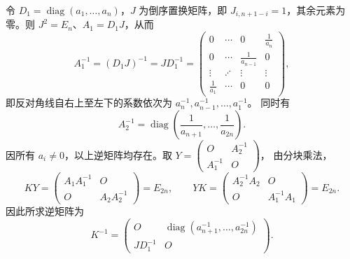 \documentclass[11pt,a4paper,fontset=fandol]{ctexart}
\newcommand{\ans}[1]{\boxed{#1}}
\newcommand{\diag}{\operatorname{diag}}
\begin{document}
令 $D_1=\diag(a_1,\ldots,a_n)$，$J$ 为倒序置换矩阵，即
$J_{i,n+1-i}=1$，其余元素为零。则 $J^2=E_n$、$A_1=D_1J$，从而
\[
A_1^{-1}=(D_1J)^{-1}=JD_1^{-1}
=\begin{pmatrix}
0&\cdots&0&\frac1{a_n}\\
0&\cdots&\frac1{a_{n-1}}&0\\
\vdots&\iddots&\vdots&\vdots\\
\frac1{a_1}&\cdots&0&0
\end{pmatrix},
\]
即反对角线自右上至左下的系数依次为 $a_n^{-1},a_{n-1}^{-1},\ldots,a_1^{-1}$。
同时有
\[
A_2^{-1}=\diag\left(\frac1{a_{n+1}},\ldots,\frac1{a_{2n}}\right).
\]
因所有 $a_i\ne0$，以上逆矩阵均存在。取
$Y=\left(\begin{smallmatrix}O&A_2^{-1}\\A_1^{-1}&O\end{smallmatrix}\right)$，
由分块乘法，
\[
KY=\begin{pmatrix}A_1A_1^{-1}&O\\O&A_2A_2^{-1}\end{pmatrix}=E_{2n},
\qquad
YK=\begin{pmatrix}A_2^{-1}A_2&O\\O&A_1^{-1}A_1\end{pmatrix}=E_{2n}.
\]
因此所求逆矩阵为
\[
\ans{K^{-1}=
\begin{pmatrix}
O&\diag\left(a_{n+1}^{-1},\ldots,a_{2n}^{-1}\right)\\[2pt]
JD_1^{-1}&O
\end{pmatrix}}.
\]
\end{document}

